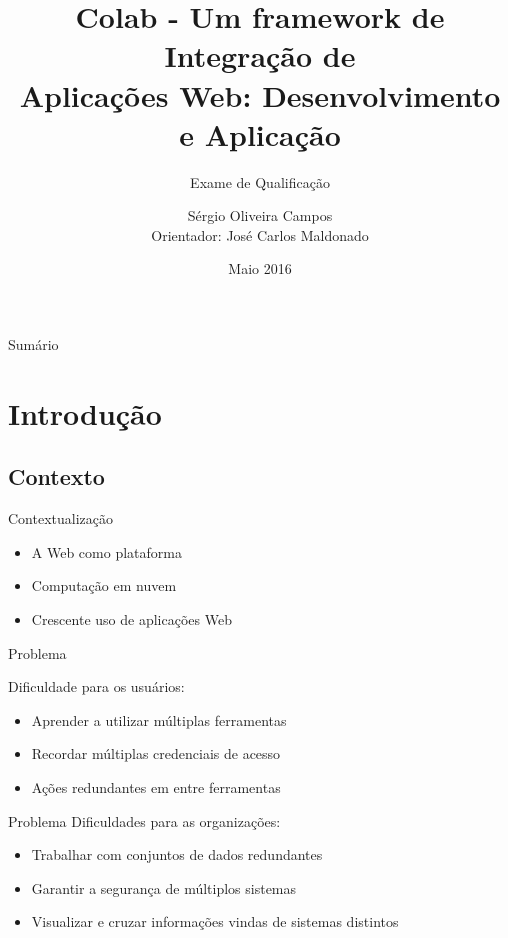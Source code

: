 \documentclass{beamer}
\title[Colab - Um framework de Integração de Aplicações Web]
{Colab - Um framework de Integração de\\Aplicações Web: Desenvolvimento e Aplicação}
\subtitle{Exame de Qualificação}
\author[Sérgio Oliveira Campos (ICMC) – 2016]{Sérgio Oliveira Campos\\{\small Orientador: José Carlos Maldonado}}
\institute[ICMC] %
{
  Instituto de Ciências Matemáticas e de Computação\\
  Universidade de São Paulo
}
\date{Maio 2016}
\begin{document}
\begin{frame}
  \titlepage
\end{frame}

\begin{frame}{Sumário}
  \tableofcontents
\end{frame}

\section{Introdução}

\subsection{Contexto}

\begin{frame}{Contextualização}

  \begin{itemize}
  \item {
    A Web como plataforma \cite{OReilly2007}
  }
  \item{
    Computação em nuvem
  }
  \item {
    Crescente uso de aplicações Web
  }
  \end{itemize}
 
\end{frame}


\begin{frame}{Problema}

  Dificuldade para os usuários:  
  \begin{itemize}
  \item {
    Aprender a utilizar múltiplas ferramentas
  }
  \item {
    Recordar múltiplas credenciais de acesso
  }
  \item {
    Ações redundantes em entre ferramentas
  }
  \end{itemize}
\end{frame}

\begin{frame}{Problema}
  Dificuldades para as organizações:
  \begin{itemize}

  \item {
    Trabalhar com conjuntos de dados redundantes
  }
  \item {
    Garantir a segurança de múltiplos sistemas
  }
  \item {
    Visualizar e cruzar informações vindas de sistemas distintos
  }
  
  \end{itemize}
\end{frame}
\end{document}
